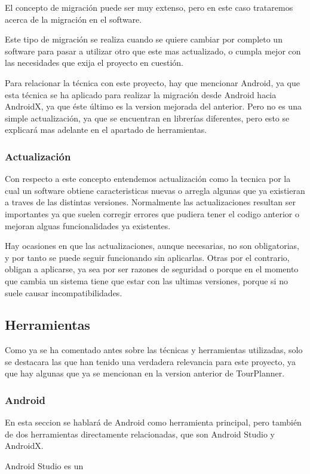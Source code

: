 El concepto de migración puede ser muy extenso, pero en este caso trataremos acerca de la migración en el software.

Este tipo de migración se realiza cuando se quiere cambiar por completo un software para pasar a utilizar otro que este mas actualizado, o cumpla mejor con las necesidades que exija el proyecto en cuestión. 

Para relacionar la técnica con este proyecto, hay que mencionar Android, ya que esta técnica se ha aplicado para realizar la migración desde Android hacia AndroidX, ya que éste último es la version mejorada del anterior. Pero no es una simple actualización, ya que se encuentran en librerías diferentes, pero esto se explicará mas adelante en el apartado de herramientas.

\subsubsection{Actualización}

Con respecto a este concepto entendemos actualización como la tecnica por la cual un software obtiene caracteristicas nuevas o arregla algunas que ya existieran a traves de las distintas versiones. Normalmente las actualizaciones resultan ser importantes ya que suelen corregir errores que pudiera tener el codigo anterior o mejoran alguas funcionalidades ya existentes.

Hay ocasiones en que las actualizaciones, aunque necesarias, no son obligatorias, y por tanto se puede seguir funcionando sin aplicarlas. Otras por el contrario, obligan a aplicarse, ya sea por ser razones de seguridad o porque en el momento que cambia un sistema tiene que estar con las ultimas versiones, porque si no suele causar incompatibilidades.

\subsection{Herramientas}

Como ya se ha comentado antes sobre las técnicas y herramientas utilizadas, solo se destacara las que han tenido una verdadera relevancia para este proyecto, ya que hay algunas que ya se mencionan en la version anterior de TourPlanner.

\subsubsection{Android}

En esta seccion se hablará de Android como herramienta principal, pero también de dos herramientas directamente relacionadas, que son Android Studio y AndroidX.

Android Studio es un 




